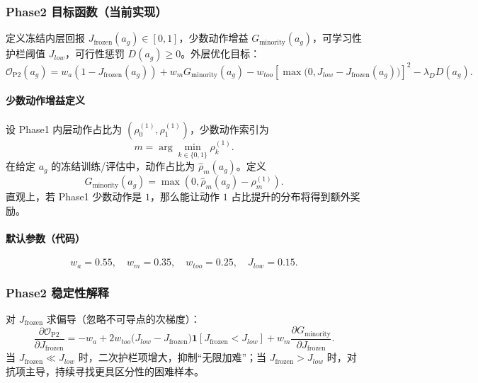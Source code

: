 \documentclass[UTF8,11pt,a4paper]{ctexart}
\begin{document}
\subsubsection{Phase2 目标函数（当前实现）}
定义冻结内层回报 \(J_{\text{frozen}}(a_g)\in[0,1]\)，少数动作增益 \(G_{\text{minority}}(a_g)\)，可学习性护栏阈值 \(J_{low}\)，可行性惩罚 \(D(a_g)\ge 0\)。外层优化目标：
\begin{equation}
\mathcal{O}_{\text{P2}}(a_g)=
w_a\!\left(1-J_{\text{frozen}}(a_g)\right)
+w_m G_{\text{minority}}(a_g)
-w_{too}\!\left[\max\!\big(0,J_{low}-J_{\text{frozen}}(a_g)\big)\right]^2
-\lambda_D D(a_g).
\end{equation}

\paragraph{少数动作增益定义}
设 Phase1 内层动作占比为 \((\rho_0^{(1)},\rho_1^{(1)})\)，少数动作索引为
\begin{equation}
m = \arg\min_{k\in\{0,1\}}\rho_k^{(1)}.
\end{equation}
在给定 \(a_g\) 的冻结训练/评估中，动作占比为 \(\hat\rho_m(a_g)\)。定义
\begin{equation}
G_{\text{minority}}(a_g)=\max\left(0,\hat\rho_m(a_g)-\rho_m^{(1)}\right).
\end{equation}
直观上，若 Phase1 少数动作是 \(1\)，那么能让动作 \(1\) 占比提升的分布将得到额外奖励。

\paragraph{默认参数（代码）}
\begin{equation}
w_a=0.55,\quad w_m=0.35,\quad w_{too}=0.25,\quad J_{low}=0.15.
\end{equation}

\subsubsection{Phase2 稳定性解释}
对 \(J_{\text{frozen}}\) 求偏导（忽略不可导点的次梯度）：
\begin{equation}
\frac{\partial \mathcal{O}_{\text{P2}}}{\partial J_{\text{frozen}}}
=
-w_a
+2w_{too}\big(J_{low}-J_{\text{frozen}}\big)\mathbf{1}[J_{\text{frozen}}<J_{low}]
+w_m\frac{\partial G_{\text{minority}}}{\partial J_{\text{frozen}}}.
\end{equation}
当 \(J_{\text{frozen}}\ll J_{low}\) 时，二次护栏项增大，抑制“无限加难”；当 \(J_{\text{frozen}}>J_{low}\) 时，对抗项主导，持续寻找更具区分性的困难样本。
\end{document}
